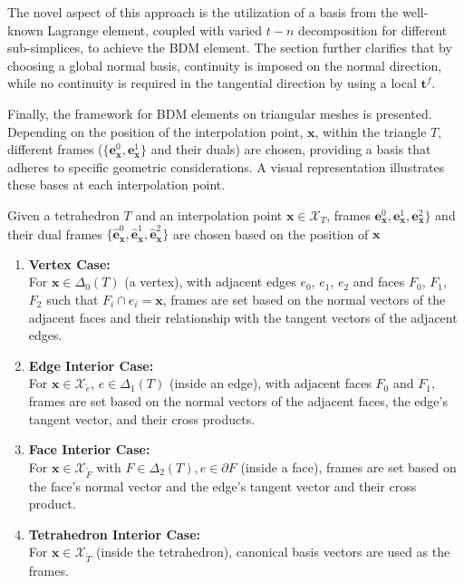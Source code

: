 \documentclass[12pt, a4paper]{article}
\newcommand{\bs}{\boldsymbol}
\begin{document}
The novel aspect of this approach is the utilization of a basis from the
well-known Lagrange element, coupled with varied $t-n$ decomposition for
different sub-simplices, to achieve the BDM element. The section further
clarifies that by choosing a global normal basis, continuity is imposed on the
normal direction, while no continuity is required in the tangential direction by
using a local $\boldsymbol{t}^f$.

Finally, the framework for BDM elements on triangular meshes is presented.
Depending on the position of the interpolation point, $\boldsymbol{x}$, within
the triangle $T$, different frames ($\{\boldsymbol{e}_{\boldsymbol{x}}^0,
\boldsymbol{e}_{\boldsymbol{x}}^1\}$ and their duals) are chosen, providing a
basis that adheres to specific geometric considerations. A visual representation
illustrates these bases at each interpolation point.

Given a tetrahedron  $T$ and an interpolation point $\boldsymbol{x} \in
\mathcal{X}_{T}$,
frames $\bs e_{\boldsymbol x}^0, \bs e_{\bs x}^1, \bs e_{\bs x}^2\}$ and their dual frames
$\{\hat {\bs e}_{\bs x}^0, \hat{\bs e}_{\bs x}^1, \hat{\bs e}_{\bs x}^2\}$  are
chosen based on the position of $\boldsymbol{x}$

\begin{enumerate}
  \item \textbf{Vertex Case:} \\
    For $\boldsymbol{x} \in \Delta_0(T)$ (a vertex), with adjacent edges $e_0$, $e_1$, $e_2$ and faces $F_0$, $F_1$, $F_2$ such that $F_i \cap e_i = \boldsymbol{x}$, frames are set based on the normal vectors of the adjacent faces and their relationship with the tangent vectors of the adjacent edges.
  \item \textbf{Edge Interior Case:} \\
    For $\boldsymbol{x} \in \mathcal{X}_{\mathring{e}}$, $e \in \Delta_1(T)$ (inside an edge), with adjacent faces $F_0$ and $F_1$, frames are set based on the normal vectors of the adjacent faces, the edge's tangent vector, and their cross products.
  \item \textbf{Face Interior Case:} \\
    For $\boldsymbol{x} \in \mathcal{X}_{\mathring{F}}$ with $F \in \Delta_2(T), e\in \partial F$ (inside a face), frames are set based on the face's normal vector and the edge's tangent vector and their cross product.
  \item \textbf{Tetrahedron Interior Case:} \\
    For $\boldsymbol{x} \in \mathcal{X}_{\mathring{T}}$ (inside the tetrahedron), canonical basis vectors are used as the frames.
\end{enumerate}
\end{document}
